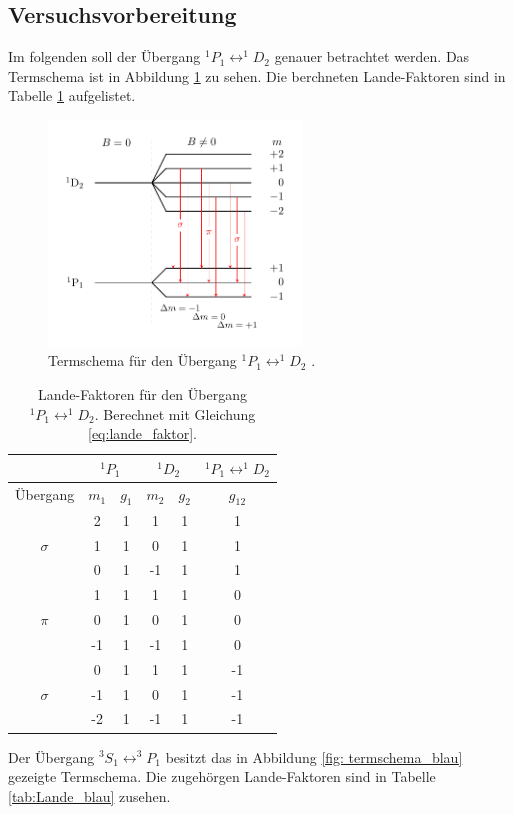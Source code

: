\subsection{Versuchsvorbereitung}

Im folgenden soll der Übergang  $^1P_1\leftrightarrow ^1\!\!D_2$ genauer betrachtet werden.
Das Termschema ist in Abbildung \ref{fig: termschema_rot} zu sehen. Die berchneten Lande-Faktoren
sind in Tabelle \ref{tab:Lande_rot} aufgelistet.

\FloatBarrier
\begin{figure}[h]
  \centering
  \includegraphics[width=0.6\textwidth]{pics/termschema_rot.pdf}
  \caption{Termschema für den Übergang $^1P_1\leftrightarrow ^1\!\!D_2$ \cite{luckyjosh}.}
  \label{fig: termschema_rot}
\end{figure}
\FloatBarrier
\FloatBarrier
\begin{table}
	\centering
  \caption{Lande-Faktoren für den Übergang $^1P_1\leftrightarrow ^1\!\!D_2$.  Berechnet mit Gleichung \eqref{eq:lande_faktor}.}
	\label{tab:Lande_rot}
	\begin{tabular}{cccccc}
		\toprule
		{} & \multicolumn{2}{c}{${}^1P_1$}  & \multicolumn{2}{c}{${}^1D_2$}  & $^1P_1\leftrightarrow ^1\!\!D_2$ \\
		\midrule
		 Übergang &   $m_1$  & $g_{1}$ & $m_2$ & $ g_2$  & $g_{12}$  \\
		\midrule
		& 2 & 1 & 1 & 1 & 1\\
		$\sigma$& 1 & 1 & 0 & 1 & 1\\
		& 0 & 1 & -1 & 1 & 1\\
		\midrule
		& 1 & 1 & 1 & 1 & 0\\
		$\pi$ & 0 & 1 & 0 & 1 & 0\\
		& -1 & 1 & -1 & 1 & 0\\
		\midrule
		& 0 & 1 & 1 & 1 & -1\\
		$\sigma$ & -1 & 1 & 0 & 1 & -1\\
		& -2 & 1 & -1 & 1 & -1\\\bottomrule
	\end{tabular}

\end{table}
\FloatBarrier
Der Übergang $^3S_1\leftrightarrow ^3\!\!P_1$ besitzt das in Abbildung \ref{fig: termschema_blau} gezeigte
Termschema. Die zugehörgen Lande-Faktoren sind in Tabelle \ref{tab:Lande_blau} zusehen.


